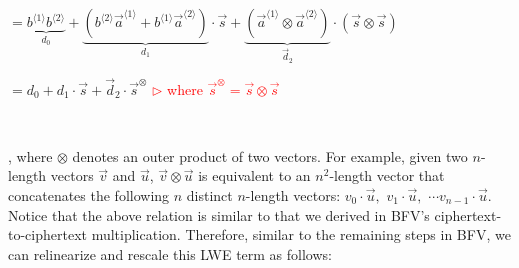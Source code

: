 $ = \underbrace{b^{\langle 1 \rangle}b^{\langle 2 \rangle}}_{d_0}  + \underbrace{(b^{\langle 2 \rangle}\vec{a}^{\langle 1 \rangle} + b^{\langle 1 \rangle}\vec{a}^{\langle 2 \rangle})}_{d_1} \cdot \vec{s} + \underbrace{(\vec{a}^{\langle 1 \rangle} \otimes \vec{a}^{\langle 2 \rangle})}_{\vec{d}_2} \cdot (\vec{s} \otimes \vec{s}) $  


$= d_0 + d_1\cdot \vec{s} + \vec{d}_2\cdot \vec{s}^{\otimes}$ \textcolor{red}{ $\rhd$ where $\vec{s}^{\otimes} = \vec{s} \otimes \vec{s}$}

$ $

, where $\otimes$ denotes an outer product of two vectors. For example, given two $n$-length vectors $\vec{v}$ and $\vec{u}$, $\vec{v} \otimes \vec{u}$ is equivalent to an $n^2$-length vector that concatenates the following $n$ distinct $n$-length vectors: $v_0\cdot\vec{u}, \,\, v_1\cdot\vec{u}, \,\, \cdots v_{n-1}\cdot\vec{u}$. Notice that the above relation is similar to that we derived in BFV's ciphertext-to-ciphertext multiplication. Therefore, similar to the remaining steps in BFV, we can relinearize and rescale this LWE term as follows:


